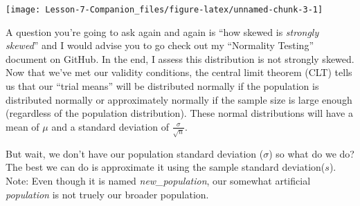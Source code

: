 \documentclass[
]{article}
\newenvironment{Shaded}{\begin{snugshade}}{\end{snugshade}}
\newcommand{\DataTypeTok}[1]{\textcolor[rgb]{0.13,0.29,0.53}{#1}}
\newcommand{\KeywordTok}[1]{\textcolor[rgb]{0.13,0.29,0.53}{\textbf{#1}}}
\newcommand{\NormalTok}[1]{#1}
\newcommand{\OperatorTok}[1]{\textcolor[rgb]{0.81,0.36,0.00}{\textbf{#1}}}
\newcommand{\StringTok}[1]{\textcolor[rgb]{0.31,0.60,0.02}{#1}}
\begin{document}
\begin{center}\texttt{[image: Lesson-7-Companion\_files/figure-latex/unnamed-chunk-3-1]} \end{center}

A question you're going to ask again and again is ``how skewed is
\emph{strongly skewed}'' and I would advise you to go check out my
``Normality Testing'' document on GitHub. In the end, I assess this
distribution is not strongly skewed. Now that we've met our validity
conditions, the central limit theorem (CLT) tells us that our ``trial
means'' will be distributed normally if the population is distributed
normally or approximately normally if the sample size is large enough
(regardless of the population distribution). These normal distributions
will have a mean of \(\mu\) and a standard deviation of
\(\frac{\sigma}{\sqrt{n}}\).

But wait, we don't have our population standard deviation (\(\sigma\))
so what do we do? The best we can do is approximate it using the sample
standard deviation(\(s\)). Note: Even though it is named
\emph{new\_population}, our somewhat artificial \emph{population} is not
truely our broader population.

\begin{Shaded}
\end{Shaded}
\end{document}
